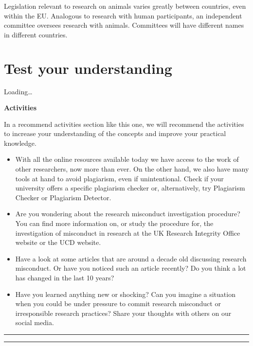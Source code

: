 \documentclass[
]{book}
\begin{document}
Legislation relevant to research on animals varies greatly between countries, even within the EU. Analogous to research with human participants, an independent committee oversees research with animals. Committees will have different names in different countries.

\hypertarget{test-your-understanding-7}{%
\section{Test your understanding}\label{test-your-understanding-7}}

Loading\ldots{}

\textbf{Activities}

In a recommend activities section like this one, we will recommend the activities to increase your understanding of the concepts and improve your practical knowledge.

\begin{itemize}
\item
  With all the online resources available today we have access to the work of other researchers, now more than ever. On the other hand, we also have many tools at hand to avoid plagiarism, even if unintentional. Check if your university offers a specific plagiarism checker or, alternatively, try Plagiarism Checker or Plagiarism Detector.
\item
  Are you wondering about the research misconduct investigation procedure? You can find more information on, or study the procedure for, the investigation of misconduct in research at the UK Research Integrity Office website or the UCD website.
\item
  Have a look at some articles that are around a decade old discussing research misconduct. Or have you noticed such an article recently? Do you think a lot has changed in the last 10 years?
\item
  Have you learned anything new or shocking? Can you imagine a situation when you could be under pressure to commit research misconduct or irresponsible research practices? Share your thoughts with others on our social media.
\end{itemize}

\begin{center}\rule{0.5\linewidth}{0.5pt}\end{center}

\begin{center}\rule{0.5\linewidth}{0.5pt}\end{center}
\end{document}
